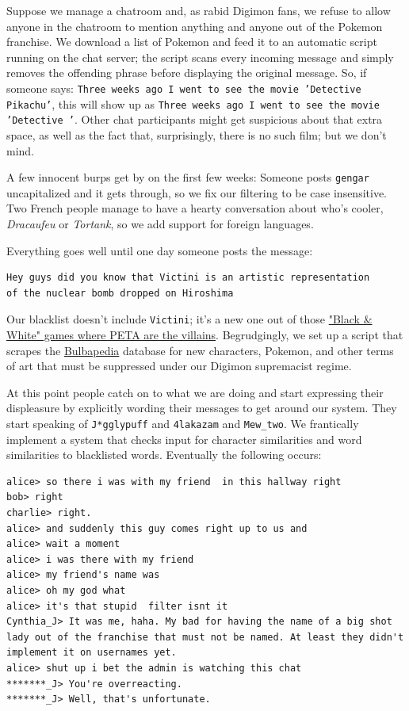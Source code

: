 \documentclass{article}
\newcommand{\code}[1]{\colorbox{ubuntuback}{\texttt{#1}}}
\begin{document}
Suppose we manage a chatroom and, as rabid Digimon fans, we refuse to allow anyone in the chatroom to mention anything and anyone out of the Pokemon franchise. We download a list of Pokemon and feed it to an automatic script running on the chat server; the script scans every incoming message and simply removes the offending phrase before displaying the original message. So, if someone says: \code{Three weeks ago I went to see the movie 'Detective Pikachu'}, this will show up as \code{Three weeks ago I went to see the movie 'Detective '}. Other chat participants might get suspicious about that extra space, as well as the fact that, surprisingly, there is no such film; but we don't mind.

A few innocent burps get by on the first few weeks: Someone posts \code{gengar} uncapitalized and it gets through, so we fix our filtering to be case insensitive. Two French people manage to have a hearty conversation about who's cooler, \textit{Dracaufeu} or \textit{Tortank}, so we add support for foreign languages.

Everything goes well until one day someone posts the message: 

\begin{lstlisting}
Hey guys did you know that Victini is an artistic representation 
of the nuclear bomb dropped on Hiroshima
\end{lstlisting}

Our blacklist doesn't include \code{Victini}; it's a new one out of those \href{https://en.wikipedia.org/wiki/Pok%C3%A9mon_Black_and_White#Story}{"Black \& White" games where PETA are the villains}. Begrudgingly, we set up a script that scrapes the \href{https://bulbapedia.bulbagarden.net}{Bulbapedia} database for new characters, Pokemon, and other terms of art that must be suppressed under our Digimon supremacist regime.

At this point people catch on to what we are doing and start expressing their displeasure by explicitly wording their messages to get around our system. They start speaking of \code{J*gglypuff} and \code{4lakazam} and \code{Mew\_two}. We frantically implement a system that checks input for character similarities and word similarities to blacklisted words. Eventually the following occurs:

\begin{lstlisting}
alice> so there i was with my friend  in this hallway right
bob> right
charlie> right.
alice> and suddenly this guy comes right up to us and
alice> wait a moment
alice> i was there with my friend 
alice> my friend's name was 
alice> oh my god what
alice> it's that stupid  filter isnt it
Cynthia_J> It was me, haha. My bad for having the name of a big shot lady out of the franchise that must not be named. At least they didn't implement it on usernames yet.
alice> shut up i bet the admin is watching this chat
*******_J> You're overreacting.
*******_J> Well, that's unfortunate.
\end{lstlisting}
\end{document}
